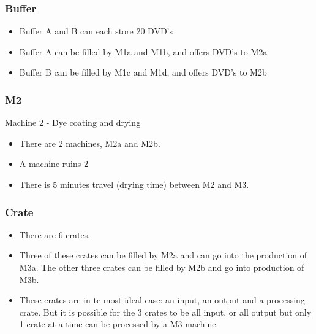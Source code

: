\documentclass[11pt,a4paper]{article}
\begin{document}
\subsubsection{Buffer}
\begin{itemize}
\item Buffer A and B can each store 20 DVD's
\item Buffer A can be filled by M1a and M1b, and offers DVD's to M2a
\item Buffer B can be filled by M1c and M1d, and offers DVD's to M2b
\end{itemize}

\subsubsection{M2}
Machine 2 - Dye coating and drying
\begin{itemize}
\item  There are 2 machines, M2a and M2b. 
\item A machine ruins 2%
\item  There is 5 minutes travel (drying time) between M2 and M3. 
\end{itemize}

\subsubsection{Crate}
\begin{itemize}
\item There are 6 crates.
\item Three of these crates can be filled by M2a and  can go into the production of M3a. The other three crates can be filled by M2b and go into production of M3b.
\item These crates are in te most ideal case: an input, an output and a processing crate. But it is possible for the 3 crates to be all input, or all output but only 1 crate at a time can be processed by a M3 machine. 

\end{itemize}
\end{document}
